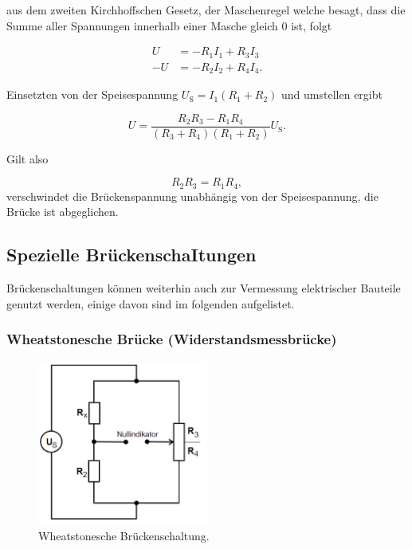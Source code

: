         \noindent aus dem zweiten Kirchhoffschen Gesetz, der Maschenregel welche besagt, dass die Summe aller Spannungen innerhalb einer Masche 
        gleich 0 ist, folgt 

        \begin{align*}
             U &= -R_1 I_1 + R_3 I_3 \\
            -U &= -R_2 I_2 + R_4 I_4 .
        \end{align*}

        \noindent Einsetzten von der Speisespannung $U_{\text{S}} = I_1 (R_1 + R_2)$ und umstellen ergibt 

        \begin{equation*}
            U = \frac{R_2 R_3 -R_1 R_4}{(R_3 + R_4)(R_1 + R_2)} U_{\text{S}}.
        \end{equation*}

        \noindent Gilt also 
        
        \begin{equation}
         R_2 R_3 = R_1 R_4,
        \label{eq:Widerstand}
        \end{equation}
        \noindent verschwindet die Brückenspannung unabhängig von der Speisespannung, die Brücke ist 
        abgeglichen.



        

    \subsection{Spezielle BrückenschaItungen}

        \noindent Brückenschaltungen können weiterhin auch zur Vermessung elektrischer Bauteile genutzt werden, einige davon 
        sind im folgenden aufgelistet.

        \subsubsection{Wheatstonesche Brücke (Widerstandsmessbrücke)}

            \begin{figure}[ht]
                \centering
                \includegraphics[width=0.5\textwidth]{latex/images/Wheat.PNG}
                \caption{Wheatstonesche Brückenschaltung\protect \cite{V302}.}
                \label{img:Wheat}
            \end{figure}


